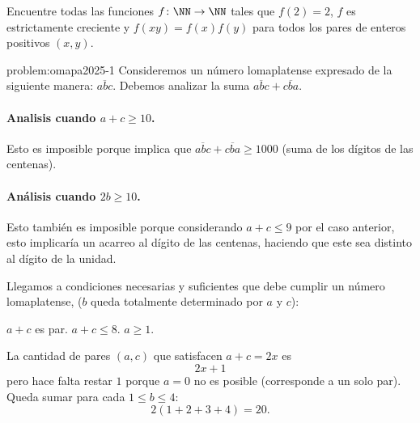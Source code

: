 \begin{problem}
Encuentre todas las funciones $f\colon\NN\to\NN$ tales que $f(2) = 2$, $f$
es estrictamente creciente y $f(xy) = f(x)f(y)$ para todos los pares de
enteros positivos $(x, y)$.
\end{problem}

\begin{solutiontoproblem}{problem:omapa2025-1}
	Consideremos un número lomaplatense expresado de la siguiente manera: $\overline{abc}$.
	Debemos analizar la suma $\overline{abc} + \overline{cba}$.

	\paragraph{Analisis cuando $a + c \geq 10$.} Esto es imposible
	porque implica que $\overline{abc} + \overline{cba} \geq 1000$
	(suma de los dígitos de las centenas).

	\paragraph{Análisis cuando $2b \geq 10$.} Esto también es imposible
	porque considerando $a + c \leq 9$ por el caso anterior,
	esto implicaría un acarreo al dígito
	de las centenas, haciendo que este sea distinto al dígito de
	la unidad.

	Llegamos a condiciones necesarias y suficientes que debe
	cumplir un número lomaplatense, ($b$ queda totalmente determinado
	por $a$ y $c$):
	\begin{itemize}
		\ii $a + c$ es par.
		\ii $a + c \leq 8$.
		\ii $a \geq 1$.
	\end{itemize}

	La cantidad de pares $\left(a, c\right)$
	que satisfacen $a + c = 2x$ es
	\[2x + 1\]
	pero hace falta restar $1$ porque $a = 0$
	no es posible (corresponde a un solo par).
	Queda sumar para cada $1 \leq b \leq 4$:
	\[2(1 + 2 + 3 + 4) = 20.\]
\end{solutiontoproblem}
